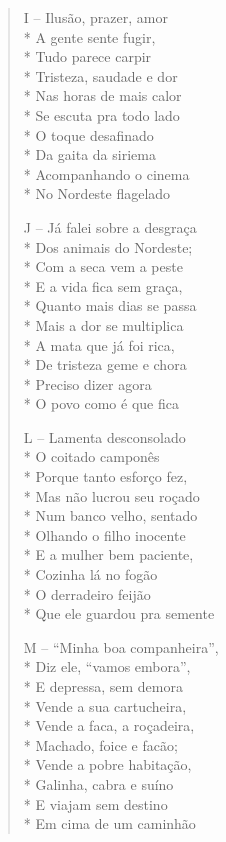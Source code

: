 \begin{verse}
I -- Ilusão, prazer, amor\\*
A gente sente fugir,\\*
Tudo parece carpir\\*
Tristeza, saudade e dor\\*
Nas horas de mais calor\\*
Se escuta pra todo lado\\*
O toque desafinado\\*
Da gaita da siriema\\*
Acompanhando o cinema\\*
No Nordeste flagelado

J -- Já falei sobre a desgraça\\*
Dos animais do Nordeste;\\*
Com a seca vem a peste\\*
E a vida fica sem graça,\\*
Quanto mais dias se passa\\*
Mais a dor se multiplica\\*
A mata que já foi rica,\\*
De tristeza geme e chora\\*
Preciso dizer agora\\*
O povo como é que fica

L -- Lamenta desconsolado\\*
O coitado camponês\\*
Porque tanto esforço fez,\\*
Mas não lucrou seu roçado\\*
Num banco velho, sentado\\*
Olhando o filho inocente\\*
E a mulher bem paciente,\\*
Cozinha lá no fogão\\*
O derradeiro feijão\\*
Que ele guardou pra semente

M -- ``Minha boa companheira'',\\*
Diz ele, ``vamos embora'',\\*
E depressa, sem demora\\*
Vende a sua cartucheira,\\*
Vende a faca, a roçadeira,\\*
Machado, foice e facão;\\*
Vende a pobre habitação,\\*
Galinha, cabra e suíno\\*
E viajam sem destino\\*
Em cima de um caminhão


\end{verse}
